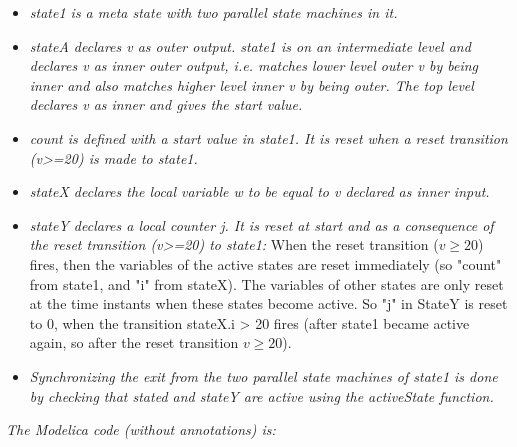\documentclass[10pt,a4paper]{report}
\begin{document}
\begin{itemize}
\item
  \emph{state1 is a meta state with two parallel state machines in it. }
\item
  \emph{stateA declares v as outer output. state1 is on an intermediate
  level and declares v as inner outer output, i.e. matches lower level
  outer v by being inner and also matches higher level inner v by being
  outer. The top level declares v as inner and gives the start value.}
\item
  \emph{count is defined with a start value in state1. It is reset when
  a reset transition (v\textgreater{}=20) is made to state1.}
\item
  \emph{stateX declares the local variable w to be equal to v declared
  as inner input.}
\item
  \emph{stateY declares a local counter j. It is reset at start and as a
  consequence of the reset transition (v\textgreater{}=20) to state1:}
  When the reset transition ($v\ge 20$) fires, then the variables of the
  active states are reset immediately (so "count" from state1, and "i"
  from stateX). The variables of other states are only reset at the time
  instants when these states become active. So "j" in StateY is reset to
  0, when the transition stateX.i \textgreater{} 20 fires (after state1
  became active again, so after the reset transition $v\ge 20$).
\item
  \emph{Synchronizing the exit from the two parallel state machines of
  state1 is done by checking that stated and stateY are active using the
  activeState function. }
\end{itemize}

\emph{The Modelica code (without annotations) is:}
\end{document}
